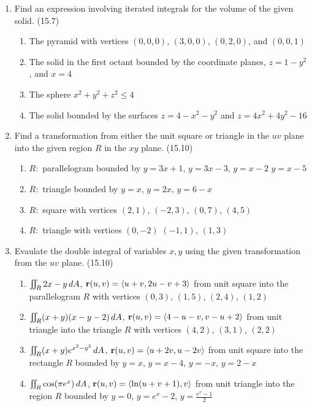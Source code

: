 \begin{enumerate}
    \newpage

    \item Find an expression involving iterated integrals for the volume of the given solid. (15.7)

      \begin{enumerate}
        \item The pyramid with vertices $(0,0,0)$, $(3,0,0)$, $(0,2,0)$, and $(0,0,1)$
        \item The solid in the first octant bounded by the coordinate planes, $z=1-y^2$, and $x=4$
        \item The sphere $x^2+y^2+z^2\leq 4$
        \item The solid bounded by the surfaces $z=4-x^2-y^2$ and $z=4x^2+4y^2-16$
      \end{enumerate}

    \item Find a transformation from either the unit square or triangle in the $uv$ plane into the given region $R$ in the $xy$ plane. (15.10)

      \begin{enumerate}
        \item $R:$ parallelogram bounded by $y=3x+1$, $y=3x-3$, $y=x-2$ $y=x-5$
        \item $R:$ triangle bounded by $y=x$, $y=2x$, $y=6-x$
        \item $R:$ square with vertices $(2,1)$, $(-2,3)$, $(0,7)$, $(4,5)$
        \item $R:$ triangle with vertices $(0,-2)$ $(-1,1)$, $(1,3)$
      \end{enumerate}

    \item Evaulate the double integral of variables $x,y$ using the given transformation from the $uv$ plane. (15.10)

      \begin{enumerate}
        \item $\iint_R 2x-y\,d{A}$, $\mathbf{r}(u,v)=\left<u+v,2u-v+3\right>$ from unit square into the parallelogram $R$ with vertices $(0,3)$, $(1,5)$, $(2,4)$, $(1,2)$
        \item $\iint_R (x+y)(x-y-2)\,d{A}$, $\mathbf{r}(u,v)=\left<4-u-v,v-u+2\right>$ from unit triangle into the triangle $R$ with vertices $(4,2)$, $(3,1)$, $(2,2)$
        \item $\iint_R (x+y)e^{x^2-y^2}\,d{A}$, $\mathbf{r}(u,v)=\left<u+2v,u-2v\right>$ from unit square into the rectangle $R$ bounded by $y=x$, $y=x-4$, $y=-x$, $y=2-x$
        \item $\iint_R \cos(\pi e^x)\,d{A}$, $\mathbf{r}(u,v)=\left<\ln (u+v+1),v\right>$ from unit triangle into the region $R$ bounded by $y=0$, $y=e^x-2$, $y=\frac{e^x-1}{2}$
      \end{enumerate}


\end{enumerate}
